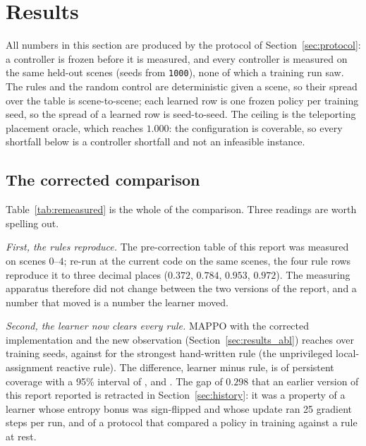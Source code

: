
\section{Results}
\label{sec:results}

All numbers in this section are produced by the protocol of
Section~\ref{sec:protocol}: a controller is frozen before it is measured, and
every controller is measured on the same \tokRuleScenes{} held-out scenes
(seeds from \texttt{1000}), none of which a training run saw.  The rules and
the random control are deterministic given a scene, so their spread over the
table is scene-to-scene; each learned row is one frozen policy per training
seed, so the spread of a learned row is seed-to-seed.  The ceiling is the
teleporting placement oracle, which reaches $1.000$: the configuration is
coverable, so every shortfall below is a controller shortfall and not an
infeasible instance.

\subsection{The corrected comparison}
\label{sec:results_corrected}

Table~\ref{tab:remeasured} is the whole of the comparison.  Three readings are
worth spelling out.

\emph{First, the rules reproduce.}  The pre-correction table of this report
was measured on scenes $0$--$4$; re-run at the current code on the same
scenes, the four rule rows reproduce it to three decimal places ($0.372$,
$0.784$, $0.953$, $0.972$).  The measuring apparatus therefore did not change
between the two versions of the report, and a number that moved is a number
the learner moved.

\emph{Second, the learner now clears every rule.}  MAPPO with the corrected
implementation and the new observation (Section~\ref{sec:results_abl}) reaches
\tokEgoShapeCK{} over \tokEgoShapeN{} training seeds, against
\tokRuleReactiveLocalCK{} for the strongest hand-written rule (the
unprivileged local-assignment reactive rule).  The difference, learner minus
rule, is \tokLearnerMinusRule{} of persistent coverage with a 95\% interval
of \tokLearnerMinusRuleCi, and \tokGapVerdict.  The gap of $0.298$ that an
earlier version of this report reported is retracted in
Section~\ref{sec:history}: it was a property of a learner whose entropy bonus
was sign-flipped and whose update ran 25 gradient steps per run, and of a
protocol that compared a policy in training against a rule at rest.


